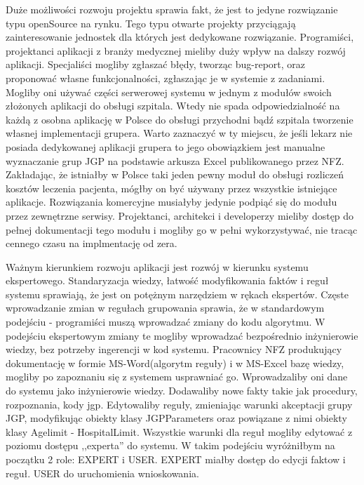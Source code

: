 Duże możliwości rozwoju projektu sprawia fakt, że jest to jedyne rozwiązanie typu openSource na rynku. Tego typu otwarte projekty przyciągają zainteresowanie jednostek dla których jest dedykowane rozwiązanie. Programiści, projektanci aplikacji z branży medycznej mieliby duży wpływ na dalszy rozwój aplikacji. Specjaliści mogliby zgłaszać błędy, tworząc bug-report, oraz proponować własne funkcjonalności, zgłaszając je w systemie z zadaniami. Mogliby oni używać części serwerowej systemu w jednym z modułów swoich złożonych aplikacji do obsługi szpitala. Wtedy nie spada odpowiedzialność na każdą z osobna aplikację w Polsce do obsługi przychodni bądź szpitala tworzenie własnej implementacji grupera. Warto zaznaczyć w ty miejscu, że jeśli lekarz nie posiada dedykowanej aplikacji grupera to jego obowiązkiem jest manualne wyznaczanie grup JGP na podstawie arkusza Excel publikowanego przez NFZ. 
Zakładając, że istniałby w Polsce taki jeden pewny moduł do obsługi rozliczeń kosztów leczenia pacjenta, mógłby on być używany przez wszystkie istniejące aplikacje. Rozwiązania komercyjne musiałyby jedynie podpiąć się do modułu przez zewnętrzne serwisy. Projektanci, architekci i developerzy mieliby dostęp do pełnej dokumentacji tego modułu i mogliby go w pełni wykorzystywać, nie tracąc cennego czasu na implmentację od zera.

Ważnym kierunkiem rozwoju aplikacji jest rozwój w kierunku systemu ekspertowego. Standaryzacja wiedzy, łatwość modyfikowania faktów i reguł systemu sprawiają, że jest on potężnym narzędziem w rękach ekspertów. Częste wprowadzanie zmian w regułach grupowania sprawia, że w standardowym podejściu - programiści muszą wprowadzać zmiany do kodu algorytmu. W podejściu ekspertowym zmiany te mogliby wprowadzać bezpośrednio inżynierowie wiedzy, bez potrzeby ingerencji w kod systemu. Pracownicy NFZ produkujący dokumentację w formie MS-Word(algorytm reguły) i w MS-Excel bazę wiedzy, mogliby po zapoznaniu się z systemem usprawniać go. Wprowadzaliby oni dane do systemu jako inżynierowie wiedzy. Dodawaliby nowe fakty takie jak procedury, rozpoznania, kody jgp. Edytowaliby reguły, zmieniając warunki akceptacji grupy JGP, modyfikując obiekty klasy JGPParameters oraz powiązane z nimi obiekty klasy Agelimit - HospitalLimit. Wszystkie warunki dla reguł mogliby edytować z poziomu dostępu ,,experta'' do systemu.
W takim podejściu wyróżniłbym na początku 2 role: EXPERT i USER. EXPERT miałby dostęp do edycji faktow i reguł. USER do uruchomienia wnioskowania.

